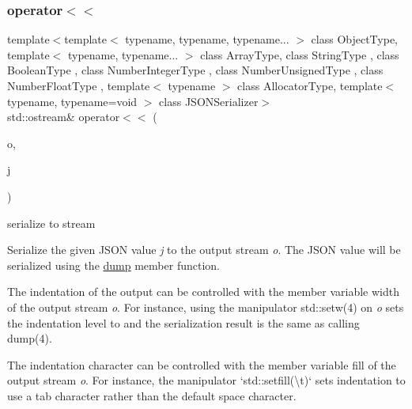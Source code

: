 \subsubsection{\texorpdfstring{operator$<$$<$}{operator<<}\hspace{0.1cm}{\footnotesize\ttfamily [1/2]}}
{\footnotesize\ttfamily template$<$template$<$ typename, typename, typename... $>$ class Object\+Type, template$<$ typename, typename... $>$ class Array\+Type, class String\+Type , class Boolean\+Type , class Number\+Integer\+Type , class Number\+Unsigned\+Type , class Number\+Float\+Type , template$<$ typename $>$ class Allocator\+Type, template$<$ typename, typename=void $>$ class J\+S\+O\+N\+Serializer$>$ \\
std\+::ostream\& operator$<$$<$ (\begin{DoxyParamCaption}\item[{std\+::ostream \&}]{o,  }\item[{const \hyperlink{classnlohmann_1_1basic__json}{basic\+\_\+json}$<$ Object\+Type, Array\+Type, String\+Type, Boolean\+Type, Number\+Integer\+Type, Number\+Unsigned\+Type, Number\+Float\+Type, Allocator\+Type, J\+S\+O\+N\+Serializer $>$ \&}]{j }\end{DoxyParamCaption})\hspace{0.3cm}{\ttfamily [friend]}}



serialize to stream 

Serialize the given J\+S\+ON value {\itshape j} to the output stream {\itshape o}. The J\+S\+ON value will be serialized using the \hyperlink{classnlohmann_1_1basic__json_a5adea76fedba9898d404fef8598aa663}{dump} member function.


\begin{DoxyItemize}
\item The indentation of the output can be controlled with the member variable {\ttfamily width} of the output stream {\itshape o}. For instance, using the manipulator {\ttfamily std\+::setw(4)} on {\itshape o} sets the indentation level to {} and the serialization result is the same as calling {\ttfamily dump(4)}.
\item The indentation character can be controlled with the member variable {\ttfamily fill} of the output stream {\itshape o}. For instance, the manipulator `std\+::setfill(\textquotesingle{}\textbackslash{}t\textquotesingle{})` sets indentation to use a tab character rather than the default space character.
\end{DoxyItemize}


